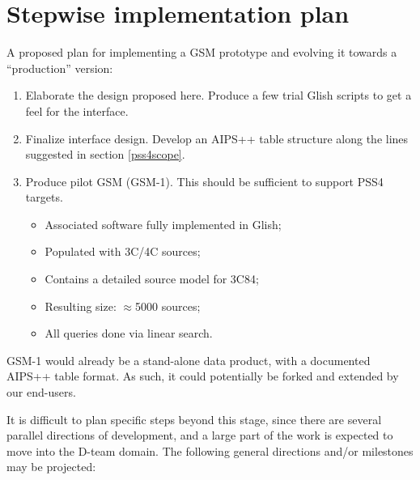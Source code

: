 \documentclass[]{lofar}
\begin{document}
\section{Stepwise implementation plan}
  
  A proposed plan for implementing a GSM prototype and evolving it towards a
  ``production'' version:
  
  \begin{enumerate}
  
  \item Elaborate the design proposed here. Produce a few trial Glish scripts to
  get a feel for the interface.
  
  \item Finalize interface design. Develop an AIPS++ table structure along the
  lines suggested in section \ref{pss4scope}.
  
  \item Produce pilot GSM (GSM-1). This should be sufficient to 
  support PSS4 targets.
  
  \begin{itemize}
  \item Associated software fully implemented in Glish;
  \item Populated with 3C/4C sources;
  \item Contains a detailed source model for 3C84;
  \item Resulting size: $\approx$5000 sources;
  \item All queries done via linear search.
  \end{itemize}
  
  \end{enumerate}
  
  GSM-1 would already be a stand-alone data product, with a documented AIPS++
  table format. As such, it could potentially be forked and extended by our
  end-users.
  
  It is difficult to plan specific steps beyond this stage, since there are
  several parallel directions of development, and a large part of the work is
  expected to move into the D-team domain. The following general directions
  and/or milestones may be projected:
  
\end{document}
